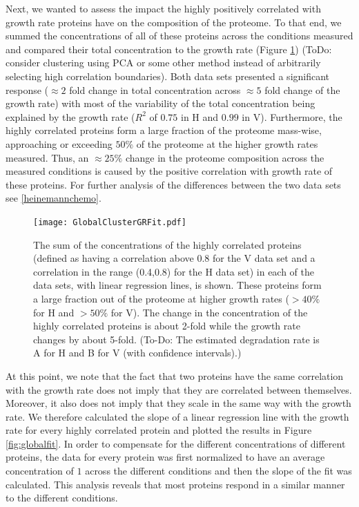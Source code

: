 \documentclass[notitlepage]{article}
\begin{document}
Next, we wanted to assess the impact the highly positively correlated with growth rate proteins have on the composition of the proteome.
To that end, we summed the concentrations of all of these proteins across the conditions measured and compared their total concentration to the growth rate (Figure \ref{fig:globalgrcorr}) (ToDo: consider clustering using PCA or some other method instead of arbitrarily selecting high correlation boundaries).
Both data sets presented a significant response ($\approx 2$ fold change in total concentration across $\approx 5$ fold change of the growth rate) with most of the variability of the total concentration being explained by the growth rate ($R^2$ of $0.75$ in H and $0.99$ in V). 
Furthermore, the highly correlated proteins form a large fraction of the proteome mass-wise, approaching or exceeding $50\%$ of the proteome at the higher growth rates measured.
Thus, an $\approx 25\%$ change in the proteome composition across the measured conditions is caused by the positive correlation with growth rate of these proteins.
For further analysis of the differences between the two data sets see \ref{heinemannchemo}.

\begin{figure}[h]
\centering
\texttt{[image: GlobalClusterGRFit.pdf]}
\caption{
The sum of the concentrations of the highly correlated proteins (defined as having a correlation above 0.8 for the V data set and a correlation in the range (0.4,0.8) for the H data set) in each of the data sets, with linear regression lines, is shown.
These proteins form a large fraction out of the proteome at higher growth rates ($>40\%$ for H and $>50\%$ for V).
The change in the concentration of the highly correlated proteins is about 2-fold while the growth rate changes by about 5-fold.
(To-Do: The estimated degradation rate is A for H and B for V (with confidence intervals).)
}
\label{fig:globalgrcorr}
\end{figure}

At this point, we note that the fact that two proteins have the same correlation with the growth rate does not imply that they are correlated between themselves.
Moreover, it also does not imply that they scale in the same way with the growth rate.
We therefore calculated the slope of a linear regression line with the growth rate for every highly correlated protein and plotted the results in Figure \ref{fig:globalfit}.
In order to compensate for the different concentrations of different proteins, the data for every protein was first normalized to have an average concentration of $1$ across the different conditions and then the slope of the fit was calculated.
This analysis reveals that most proteins respond in a similar manner to the different conditions.
\end{document}

